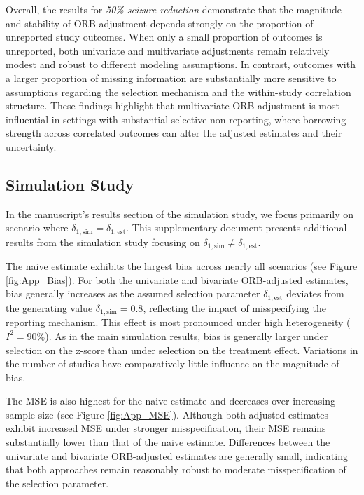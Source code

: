 Overall, the results for \textit{50\% seizure reduction} demonstrate that the magnitude and stability of ORB adjustment depends strongly on the proportion of unreported study outcomes. When only a small proportion of outcomes is unreported, both univariate and multivariate adjustments remain relatively modest and robust to different modeling assumptions. In contrast, outcomes with a larger proportion of missing information are substantially more sensitive to assumptions regarding the selection mechanism and the within-study correlation structure. These findings highlight that multivariate ORB adjustment is most influential in settings with substantial selective non-reporting, where borrowing strength across correlated outcomes can alter the adjusted estimates and their uncertainty.

\subsection*{Simulation Study}
In the manuscript’s results section of the simulation study, we focus primarily on scenario where $\delta_{1,\text{sim}} = \delta_{1,\text{est}}$. This supplementary document presents additional results from the simulation study focusing on $\delta_{1,\text{sim}} \neq \delta_{1,\text{est}}$. 

The naive estimate exhibits the largest bias across nearly all scenarios (see Figure \ref{fig:App_Bias}). For both the univariate and bivariate ORB-adjusted estimates, bias generally increases as the assumed selection parameter $\delta_{1,\text{est}}$ deviates from the generating value $\delta_{1,\text{sim}}=0.8$, reflecting the impact of misspecifying the reporting mechanism. This effect is most pronounced under high heterogeneity ($I^2=90\%$). As in the main simulation results, bias is generally larger under selection on the z-score than under selection on the treatment effect. Variations in the number of studies have comparatively little influence on the magnitude of bias.

The MSE is also highest for the naive estimate and decreases over increasing sample size (see Figure \ref{fig:App_MSE}). Although both adjusted estimates exhibit increased MSE under stronger misspecification, their MSE remains substantially lower than that of the naive estimate. Differences between the univariate and bivariate ORB-adjusted estimates are generally small, indicating that both approaches remain reasonably robust to moderate misspecification of the selection parameter.


